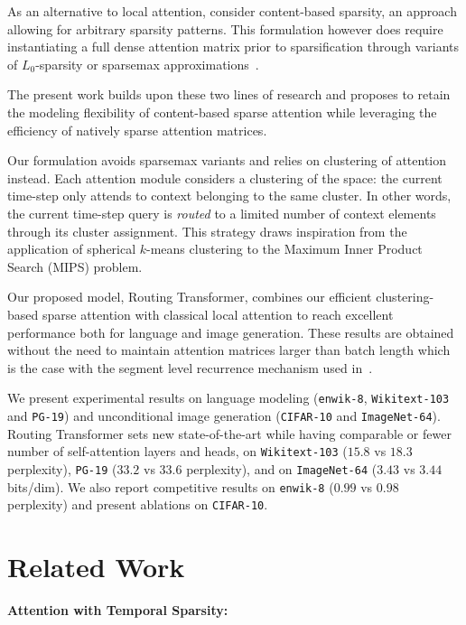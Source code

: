 As an alternative to local attention, \citet{correia2019adaptively} 
consider content-based sparsity, an approach allowing for arbitrary sparsity patterns. This formulation however does require instantiating a full dense attention matrix prior to sparsification through variants of \(L_0\)-sparsity 
or sparsemax approximations~\citep{blondel2019Fenchel}.

The present work builds upon these two lines of research and proposes to retain the modeling flexibility of content-based sparse attention while leveraging the efficiency of natively sparse attention matrices.

Our formulation avoids sparsemax variants and relies on clustering of attention instead. Each attention module considers a clustering of the space: the current time-step only attends to context belonging to the same cluster. In other words, the current time-step query is \emph{routed} to a limited number of context elements through its cluster assignment. This strategy draws inspiration from the application of spherical \(k\)-means clustering to the Maximum Inner Product Search (MIPS) problem.

Our proposed model, Routing Transformer, combines our efficient clustering-based sparse attention with classical local attention to reach excellent performance both for language and image generation. These results are obtained without the need to maintain attention matrices larger than batch length which is the case with the segment level recurrence mechanism used in~\citet{dai2019transformer,
sukhbaatar2019adaptive}. 

We present experimental results on language modeling 
(\texttt{enwik-8}, \texttt{Wikitext-103} and \texttt{PG-19}) and unconditional image generation (\texttt{CIFAR-10} and \texttt{ImageNet-64}). 
Routing Transformer sets new state-of-the-art while having comparable or fewer number of self-attention layers and heads, on 
\texttt{Wikitext-103} ($15.8$ vs $18.3$ perplexity),
\texttt{PG-19} (\(33.2\) vs \(33.6\) perplexity), and on \texttt{ImageNet-64} ($3.43$ vs $3.44$ bits/dim). We also report competitive results on \texttt{enwik-8} ($0.99$ vs $0.98$ perplexity) and present ablations on \texttt{CIFAR-10}.

\section{Related Work}

{\bf Attention with Temporal Sparsity:} 

